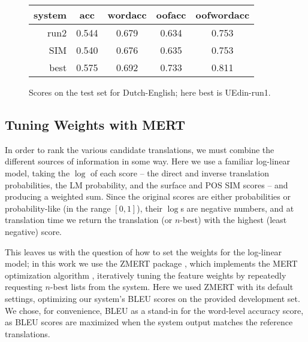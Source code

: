 \documentclass[11pt,a4paper]{article}
\begin{document}
\begin{figure}[t]
  \begin{center}
  \begin{tabular}{|r|c|c|c|c|}
    \hline
    system & acc      & wordacc  & oofacc & oofwordacc \\
    \hline
    run2        &  0.544      &  0.679  & 0.634   & 0.753    \\
    SIM              &  0.540      &  0.676  & 0.635   & 0.753    \\
    best       &  0.575   & 0.692  & 0.733      &  0.811 \\
    \hline
  \end{tabular}
  \end{center}
\caption{Scores on the test set for Dutch-English; here best is UEdin-run1.}
\label{fig:theresults-nl-en}
\end{figure}



\subsection{Tuning Weights with MERT}
\label{sec:mert}

In order to rank the various candidate translations, we must combine the
different sources of information in some way.  Here we use a familiar
log-linear model, taking the $\log$ of each score -- the direct and inverse
translation probabilities, the LM probability, and the surface and POS SIM
scores -- and producing a weighted sum. Since the original scores are either
probabilities or probability-like (in the range $[0,1]$), their $\log$s are
negative numbers, and at translation time we return the translation (or
$n$-best) with the highest (least negative) score.

This leaves us with the question of how to set the weights for the log-linear
model; in this work we use the ZMERT package \cite{zaidan:zmert:09}, which
implements the MERT optimization algorithm \cite{och:2003:ACL}, iteratively
tuning the feature weights by repeatedly requesting $n$-best lists from the
system. Here we used ZMERT with its default settings, optimizing our system's
BLEU scores on the provided development set. We chose, for convenience, BLEU as
a stand-in for the word-level accuracy score, as BLEU scores are maximized when
the system output matches the reference translations.
\end{document}
